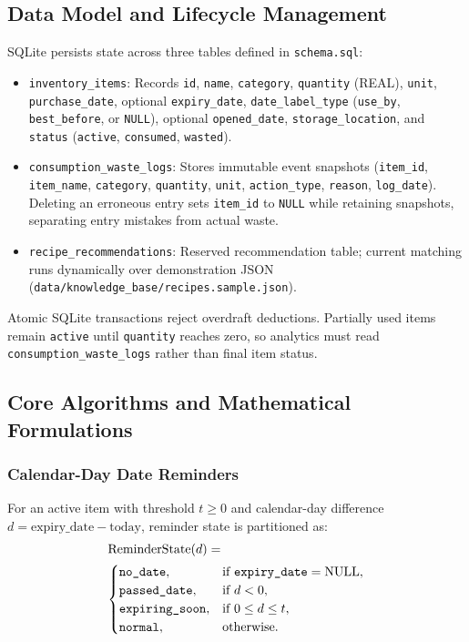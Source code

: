 \subsection{Data Model and Lifecycle Management}

SQLite persists state across three tables defined in \texttt{schema.sql}:
\begin{itemize}
    \item \texttt{inventory\_items}: Records \texttt{id}, \texttt{name}, \texttt{category}, \texttt{quantity} (REAL), \texttt{unit}, \texttt{purchase\_date}, optional \texttt{expiry\_date}, \texttt{date\_label\_type} (\texttt{use\_by}, \texttt{best\_before}, or \texttt{NULL}), optional \texttt{opened\_date}, \texttt{storage\_location}, and \texttt{status} (\texttt{active}, \texttt{consumed}, \texttt{wasted}).
    \item \texttt{consumption\_\allowbreak waste\_logs}: Stores immutable event snapshots (\texttt{item\_id}, \texttt{item\_name}, \texttt{category}, \texttt{quantity}, \texttt{unit}, \texttt{action\_type}, \texttt{reason}, \texttt{log\_date}). Deleting an erroneous entry sets \texttt{item\_id} to \texttt{NULL} while retaining snapshots, separating entry mistakes from actual waste.
    \item \texttt{recipe\_\allowbreak recommendations}: Reserved recommendation table; current matching runs dynamically over demonstration JSON (\texttt{data/knowledge\_base/\allowbreak recipes.sample.json}).
\end{itemize}
Atomic SQLite transactions reject overdraft deductions. Partially used items remain \texttt{active} until \texttt{quantity} reaches zero, so analytics must read \texttt{consumption\_\allowbreak waste\_logs} rather than final item status.

\subsection{Core Algorithms and Mathematical Formulations}

\subsubsection{Calendar-Day Date Reminders}
For an active item with threshold $t \ge 0$ and calendar-day difference $d = \text{expiry\_date} - \text{today}$, reminder state is partitioned as:
\begin{equation}
\begin{gathered}
\text{ReminderState}(d) = \hfill \\
\begin{cases}
\texttt{no\_date}, & \text{if } \texttt{expiry\_date} = \text{NULL}, \\
\texttt{passed\_date}, & \text{if } d < 0, \\
\texttt{expiring\_soon}, & \text{if } 0 \le d \le t, \\
\texttt{normal}, & \text{otherwise}.
\end{cases}
\end{gathered}
\end{equation}

